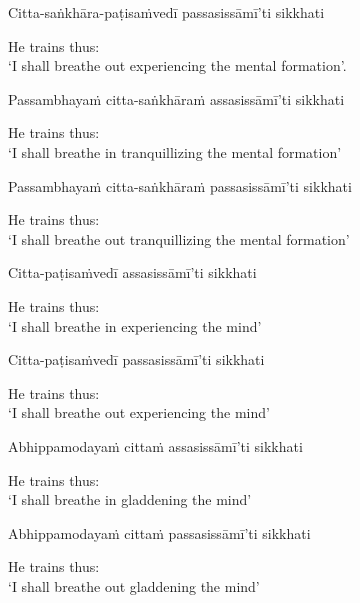 Citta-saṅkhāra-paṭisaṁvedī passasissāmī'ti sikkhati

\begin{english}
  He trains thus:\\
  `I shall breathe out experiencing the mental formation'.
\end{english}

Passambhayaṁ citta-saṅkhāraṁ assasissāmī'ti sikkhati

\begin{english}
  He trains thus:\\
  `I shall breathe in tranquillizing the mental formation'\makeatletter\hyperlink{endnote70-appendix}\makeatother
\end{english}

Passambhayaṁ citta-saṅkhāraṁ passasissāmī'ti sikkhati

\begin{english}
  He trains thus:\\
  `I shall breathe out tranquillizing the mental formation'
\end{english}

Citta-paṭisaṁvedī assasissāmī'ti sikkhati

\begin{english}
  He trains thus:\\
  `I shall breathe in experiencing the mind'
\end{english}

Citta-paṭisaṁvedī passasissāmī'ti sikkhati

\begin{english}
  He trains thus:\\
  `I shall breathe out experiencing the mind'
\end{english}

Abhippamodayaṁ cittaṁ assasissāmī'ti sikkhati

\begin{english}
  He trains thus:\\
  `I shall breathe in gladdening the mind'
\end{english}

Abhippamodayaṁ cittaṁ passasissāmī'ti sikkhati

\begin{english}
  He trains thus:\\
  `I shall breathe out gladdening the mind'
\end{english}

